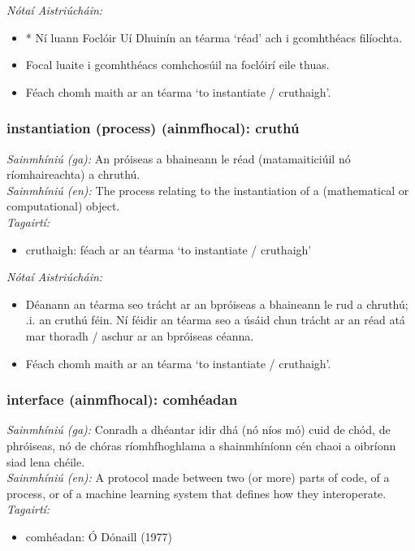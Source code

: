  \noindent \textit{Nótaí Aistriúcháin:}
\begin{itemize}
	\item * Ní luann Foclóir Uí Dhuinín an téarma `réad' ach i gcomhthéacs filíochta.
	\item Focal luaite i gcomhthéacs comhchosúil na foclóirí eile thuas.
	\item Féach chomh maith ar an téarma `to instantiate / cruthaigh'.
\end{itemize}


\subsubsection*{instantiation (process) (ainmfhocal): cruthú}
 \noindent \textit{Sainmhíniú (ga):} An próiseas a bhaineann le réad (matamaiticiúil nó ríomhaireachta) a chruthú.
\\
 \noindent \textit{Sainmhíniú (en):} The process relating to the instantiation of a (mathematical or computational) object.
\\
 \noindent \textit{Tagairtí:}
\begin{itemize}
	\item cruthaigh: féach ar an téarma `to instantiate / cruthaigh'
\end{itemize}

 \noindent \textit{Nótaí Aistriúcháin:}
\begin{itemize}
	\item Déanann an téarma seo trácht ar an bpróiseas a bhaineann le rud a chruthú; .i. an cruthú féin. Ní féidir an téarma seo a úsáid chun trácht ar an réad atá mar thoradh / aschur ar an bpróiseas céanna.
	\item Féach chomh maith ar an téarma `to instantiate / cruthaigh'.
\end{itemize}


\subsubsection*{interface (ainmfhocal): comhéadan}
 \noindent \textit{Sainmhíniú (ga):} Conradh a dhéantar idir dhá (nó níos mó) cuid de chód, de phróiseas, nó de chóras ríomhfhoghlama a shainmhíníonn cén chaoi a oibríonn siad lena chéile.
\\
 \noindent \textit{Sainmhíniú (en):} A protocol made between two (or more) parts of code, of a process, or of a machine learning system that defines how they interoperate.
\\
 \noindent \textit{Tagairtí:}
\begin{itemize}
	\item comhéadan: Ó Dónaill (1977) \cite{odonaill}
\end{itemize}

